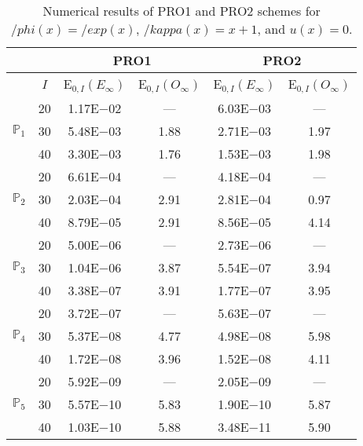\begin{table}[H]
\caption{Numerical results of PRO1 and PRO2 schemes for $/phi(x)=/exp(x)$, $/kappa(x)=x+1$, and $u(x)=0$.}
\setlength{\tabcolsep}{5pt}
\centering
\begin{tabular}{@{}l c c c c c@{}}
\toprule
 &  & \multicolumn{2}{c}{PRO1} & \multicolumn{2}{c}{PRO2}\\
\midrule
 & $I$ & E$_{0,I}(E_{\infty})$ & E$_{0,I}(O_{\infty})$ & E$_{0,I}(E_{\infty})$ & E$_{0,I}(O_{\infty})$\\
\midrule
\multirow{3}{*}{$\mathbb{P}_{1}$}
 & 20 & 1.17E$-$02 & --- & 6.03E$-$03 & ---\\
 & 30 & 5.48E$-$03 & 1.88 & 2.71E$-$03 & 1.97 \\
 & 40 & 3.30E$-$03 & 1.76 & 1.53E$-$03 & 1.98 \\
\midrule
\multirow{3}{*}{$\mathbb{P}_{2}$}
 & 20 & 6.61E$-$04 & --- & 4.18E$-$04 & ---\\
 & 30 & 2.03E$-$04 & 2.91 & 2.81E$-$04 & 0.97 \\
 & 40 & 8.79E$-$05 & 2.91 & 8.56E$-$05 & 4.14 \\
\midrule
\multirow{3}{*}{$\mathbb{P}_{3}$}
 & 20 & 5.00E$-$06 & --- & 2.73E$-$06 & ---\\
 & 30 & 1.04E$-$06 & 3.87 & 5.54E$-$07 & 3.94 \\
 & 40 & 3.38E$-$07 & 3.91 & 1.77E$-$07 & 3.95 \\
\midrule
\multirow{3}{*}{$\mathbb{P}_{4}$}
 & 20 & 3.72E$-$07 & --- & 5.63E$-$07 & ---\\
 & 30 & 5.37E$-$08 & 4.77 & 4.98E$-$08 & 5.98 \\
 & 40 & 1.72E$-$08 & 3.96 & 1.52E$-$08 & 4.11 \\
\midrule
\multirow{3}{*}{$\mathbb{P}_{5}$}
 & 20 & 5.92E$-$09 & --- & 2.05E$-$09 & ---\\
 & 30 & 5.57E$-$10 & 5.83 & 1.90E$-$10 & 5.87 \\
 & 40 & 1.03E$-$10 & 5.88 & 3.48E$-$11 & 5.90 \\
\bottomrule
\end{tabular}
\label{Table:PRO:Test6}
\end{table}
